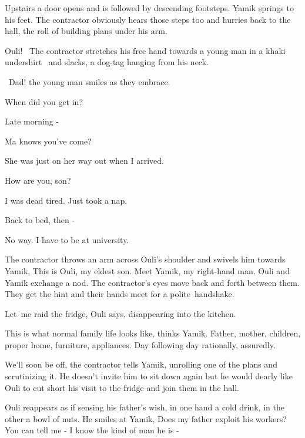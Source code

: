 \documentclass[12pt]{book}
\begin{document}
Upstairs a door opens and is followed by descending footsteps. Yamik springs to his feet. The contractor obviously hears
those steps too and hurries back to the hall, the roll of building plans under his arm.

{\textquotedbl}Ouli!{\textquotedbl} \ The contractor stretches his free hand towards a young man in a khaki undershirt
{\ }and slacks,{ }a dog-tag hanging from his neck.

~{\textquotedbl}Dad!{\textquotedbl} the young man smiles as they embrace.

{\textquotedbl}When did you get in?{\textquotedbl}

{\textquotedbl}Late morning -{\textquotedbl}

{\textquotedbl}Ma knows you've come?{\textquotedbl}

{\textquotedbl}She was just on her way out when I arrived.{\textquotedbl}

{\textquotedbl}How are you, son?{\textquotedbl}

{\textquotedbl}I was dead tired. Just took a nap.{\textquotedbl}

{\textquotedbl}Back to bed, then -{\textquotedbl}

{\textquotedbl}No way. I have to be at university.{\textquotedbl}

The contractor throws an arm across Ouli's shoulder and swivels him towards Yamik, {\textquotedbl}This is Ouli, my
eldest son. Meet Yamik, my right-hand man.{\textquotedbl} Ouli and Yamik exchange a nod. The contractor's eyes move
back and forth between them. They get the hint and their hands meet for a polite~handshake.

{\textquotedbl}Let~me raid the fridge,{\textquotedbl} Ouli says, disappearing into the kitchen.

This is what normal family life looks like, thinks Yamik. Father, mother, children, proper home, furniture, appliances.
Day following day rationally, assuredly.

{\textquotedbl}We'll soon be off,{\textquotedbl} the contractor tells Yamik, unrolling one of the plans and scrutinizing
it. He doesn't invite him to sit down again but he would dearly like Ouli to cut short his visit to the fridge and join
them in the hall.

Ouli reappears as if sensing his father's wish, in one hand a cold drink, in the other a bowl of nuts. He smiles at
Yamik, {\textquotedbl}Does my father exploit his workers? You can tell me - I know the kind of man he is
-{\textquotedbl}
\end{document}
